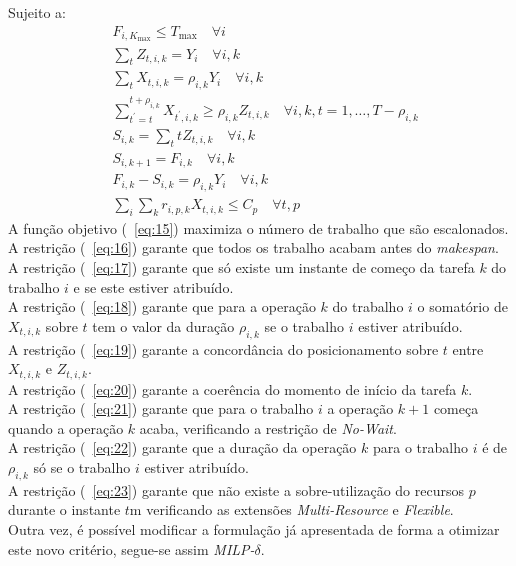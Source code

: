Sujeito a:
\begin{align}
&F_{i,K_{\max}} \leq T_{\max} \quad \forall i \label{eq:16} \\
&\sum_{t}Z_{t,i,k} = Y_{i} \quad \forall i,k \label{eq:17} \\
&\sum_{t}X_{t,i,k} = \rho_{i,k}Y_{i} \quad \forall i,k \label{eq:18} \\
&\sum^{t+\rho_{i,k}}_{t^{'}=t}X_{t^{'},i,k} \geq \rho_{i,k}Z_{t,i,k} \quad \forall i,k,t=1, \ldots,T-\rho_{i,k} \label{eq:19} \\
&S_{i,k} = \sum_{t}tZ_{t,i,k} \quad \forall i,k \label{eq:20} \\
&S_{i,k+1} = F_{i,k} \quad \forall i,k \label{eq:21} \\
&F_{i,k} - S_{i,k} = \rho_{i,k}Y_{i} \quad \forall i,k \label{eq:22} \\
&\sum_{i}\sum_{k}r_{i,p,k}X_{t,i,k} \leq C_{p} \quad \forall t,p \label{eq:23}
\end{align}
A função objetivo (~\ref{eq:15}) maximiza o número de trabalho que são escalonados.\\
A restrição (~\ref{eq:16}) garante que todos os trabalho acabam antes do \textit{makespan}.\\
A restrição (~\ref{eq:17}) garante que só existe um instante de começo da tarefa $k$ do trabalho $i$ e se este estiver atribuído.\\
A restrição (~\ref{eq:18}) garante que para a operação $k$ do trabalho $i$ o somatório de $X_{t,i,k}$ sobre $t$ tem o valor da duração $\rho_{i,k}$ se o trabalho $i$ estiver atribuído. \\
A restrição (~\ref{eq:19}) garante a concordância do posicionamento sobre $t$ entre $X_{t,i,k}$ e $Z_{t,i,k}$. \\
A restrição (~\ref{eq:20}) garante a coerência do momento de início da tarefa $k$.\\
A restrição (~\ref{eq:21}) garante que para o trabalho $i$ a operação $k+1$ começa quando a operação $k$ acaba, verificando a restrição de \textit{No-Wait}. \\
A restrição (~\ref{eq:22}) garante que a duração da operação $k$ para o trabalho $i$ é de $\rho_{i,k}$ só se o trabalho $i$ estiver atribuído.\\
A restrição (~\ref{eq:23}) garante que não existe a sobre-utilização do recursos $p$ durante o instante $t$m verificando as extensões \textit{Multi-Resource} e \textit{Flexible}.\\

Outra vez, é possível modificar a formulação já apresentada de forma a otimizar este novo critério, segue-se assim \textit{MILP-$\delta$}.

